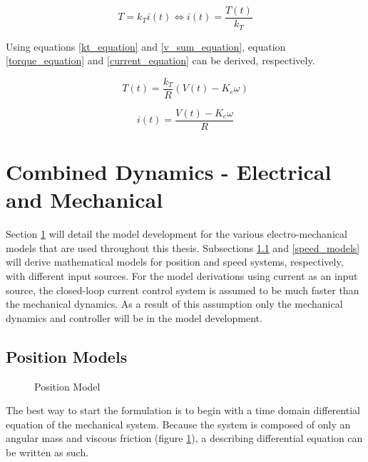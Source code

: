 \begin{equation}
\label{kt_equation}
T = k_Ti(t) \Leftrightarrow i(t) = \frac{T(t)}{k_T}
\end{equation}

Using equations \ref{kt_equation} and \ref{v_sum_equation}, equation \ref{torque_equation} and \ref{current_equation} can be derived, respectively.

\begin{equation}
\label{torque_equation}
T(t) = \frac{k_T}{R}(V(t)-K_e\omega)
\end{equation}

\begin{equation}
\label{current_equation}
i(t) = \frac{V(t)-K_e\omega}{R}
\end{equation}


\section{Combined Dynamics - Electrical and Mechanical}
\label{mechanical_dynamics}
Section \ref{mechanical_dynamics} will detail the model development for the various electro-mechanical models that are used throughout this thesis. Subsections \ref{position_models} and \ref{speed_models} will derive mathematical models for position and speed systems, respectively, with different input sources. For the model derivations using current as an input source, the closed-loop current control system is assumed to be much faster than the mechanical dynamics. As a result of this assumption only the mechanical dynamics and controller will be in the model development.


\subsection{Position Models}
\label{position_models}

\begin{figure}[H]
	\begin{center}
		\caption[Position Model]{Position Model}
		\label{model_chp4}
		
	\end{center}
\end{figure}

The best way to start the formulation is to begin with a time domain differential equation of the mechanical system. Because the system is composed of only an angular mass and viscous friction (figure \ref{model_chp4}), a describing differential equation can be written as such.

